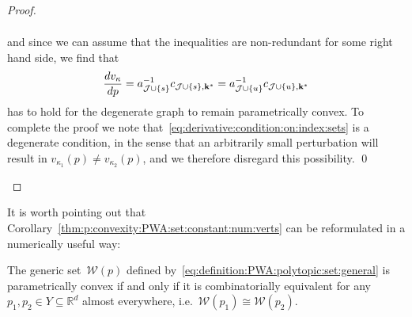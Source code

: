 \documentclass[smallextended]{svjour3}       %
\numberwithin{equation}{section}
\begin{document}
\begin{proof}
\begin{enumerate}
\begin{align*}
\end{align*}
%
and since we can assume that the inequalities are non-redundant for some right hand side, we find that 
%
\begin{equation}\label{eq:derivative:condition:on:index:sets}
  \frac{dv_\kappa}{dp} = a_{\mathcal J\cup \{s\}}^{-1}c_{\mathcal J\cup \{s\},{\bf{k}}^\ast} = 
  a_{\mathcal J\cup \{u\}}^{-1}c_{\mathcal J\cup \{u\},{\bf{k}}^\ast}
\end{equation}
%
has to hold for the degenerate graph to remain parametrically convex.
%
To complete the proof we note that~\eqref{eq:derivative:condition:on:index:sets} is a degenerate condition, in the sense that an arbitrarily small perturbation will result in $v_{\kappa_1}(p) \neq v_{\kappa_2}(p)$, and we therefore disregard this possibility.
\qed
\end{enumerate}
\end{proof}
%
It is worth pointing out that Corollary~\ref{thm:p:convexity:PWA:set:constant:num:verts} can be reformulated in a numerically useful way:
%
\begin{corollary}\label{thm:combinatorical:equivalence:alternative}
The generic set~$\mathcal W(p)$ defined by~\eqref{eq:definition:PWA:polytopic:set:general} is parametrically convex if and only if it is combinatorially equivalent for any $p_1,p_2\in Y\subseteq\mathbb R^d$ almost everywhere, i.e.\ $\mathcal W(p_1)\cong\mathcal W(p_2)$.
\end{corollary}
%
\end{document}

